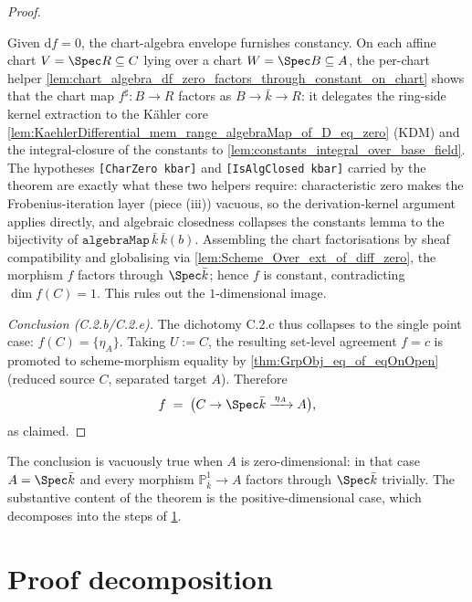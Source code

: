 \begin{proof}
\begin{itemize}
      Given \(\mathrm df = 0\), the chart-algebra envelope furnishes constancy.
      On each affine chart \(V = \Spec R \subseteq C\) lying over a chart
      \(W = \Spec B \subseteq A\), the per-chart helper
      \cref{lem:chart_algebra_df_zero_factors_through_constant_on_chart} shows
      that the chart map \(f^{\sharp} \colon B \to R\) factors as
      \(B \to \bar k \to R\): it delegates the ring-side kernel extraction to
      the K\"ahler core \cref{lem:KaehlerDifferential_mem_range_algebraMap_of_D_eq_zero}
      (KDM) and the integral-closure of the constants to
      \cref{lem:constants_integral_over_base_field}. The hypotheses
      \texttt{[CharZero kbar]} and \texttt{[IsAlgClosed kbar]} carried by the
      theorem are exactly what these two helpers require: characteristic zero
      makes the Frobenius-iteration layer (piece (iii)) vacuous, so the
      derivation-kernel argument applies directly, and algebraic closedness
      collapses the constants lemma to the bijectivity of
      \(\mathtt{algebraMap}\,\bar k\,\bar k(b)\). Assembling the chart
      factorisations by sheaf compatibility and globalising via
      \cref{lem:Scheme_Over_ext_of_diff_zero}, the morphism \(f\) factors
      through \(\Spec \bar k\); hence \(f\) is constant, contradicting
      \(\dim f(C) = 1\). This rules out the \(1\)-dimensional image.
  \end{itemize}

  \emph{Conclusion (C.2.b/C.2.e).} The dichotomy C.2.c thus collapses to the
  single point case: \(f(C) = \{\eta_A\}\). Taking \(U := C\), the resulting
  set-level agreement \(f = c\) is promoted to scheme-morphism equality by
  \cref{thm:GrpObj_eq_of_eqOnOpen} (reduced source \(C\), separated target
  \(A\)). Therefore
  \[
    f \;=\; \bigl(C \to \Spec \bar k \xrightarrow{\,\eta_A\,} A\bigr),
  \]
  as claimed.
\end{proof}

\begin{remark}
  \label{rem:rigidity_over_kbar_dim_dichotomy}
  
  The conclusion is vacuously true when \(A\) is zero-dimensional: in that case \(A = \Spec \bar k\) and every morphism \(\mathbb P^1_{\bar k} \to A\) factors through \(\Spec \bar k\) trivially. The substantive content of the theorem is the positive-dimensional case, which decomposes into the steps of \cref{sec:RigidityKbar_proof_decomposition}.
\end{remark}

\section{Proof decomposition}
\label{sec:RigidityKbar_proof_decomposition}

